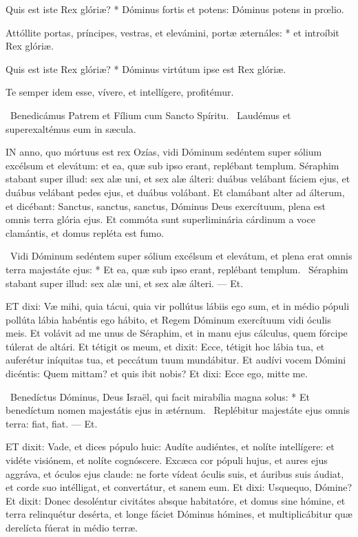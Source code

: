 Quis est iste Rex glóriæ? * Dóminus fortis et potens: Dóminus potens in prœlio.

Attóllite portas, príncipes, vestras, et elevámini, portæ æternáles: * et introíbit Rex glóriæ.

Quis est iste Rex glóriæ? * Dóminus virtútum ipse est Rex glóriæ.

 Te semper idem esse, vívere, et intellígere, profitémur.

\V\ Benedicámus Patrem et Fílium cum Sancto Spíritu. \R\ Laudémus et superexaltémus eum in sæcula.



\lettrine[lines=2]{I}{N} anno, quo mórtuus est rex Ozías, vidi Dóminum sedéntem super sólium excélsum et elevátum: et ea, quæ sub ipso erant, replébant templum. Séraphim stabant super illud: sex alæ uni, et sex alæ álteri: duábus velábant fáciem ejus, et duábus velábant pedes ejus, et duábus volábant. Et clamábant alter ad álterum, et dicébant: Sanctus, sanctus, sanctus, Dóminus Deus exercítuum, plena est omnis terra glória ejus. Et commóta sunt superliminária cárdinum a voce clamántis, et domus repléta est fumo.

\R\ Vidi Dóminum sedéntem super sólium excélsum et elevátum, et plena erat omnis terra majestáte ejus: * Et ea, quæ sub ipso erant, replébant templum. \V\ Séraphim stabant super illud: sex alæ uni, et sex alæ álteri. --- Et.


\lettrine[lines=2]{E}{T} dixi: Væ mihi, quia tácui, quia vir pollútus lábiis ego sum, et in médio pópuli pollúta lábia habéntis ego hábito, et Regem Dóminum exercítuum vidi óculis meis. Et volávit ad me unus de Séraphim, et in manu ejus cálculus, quem fórcipe túlerat de altári. Et tétigit os meum, et dixit: Ecce, tétigit hoc lábia tua, et auferétur iníquitas tua, et peccátum tuum mundábitur. Et audívi vocem Dómini dicéntis: Quem mittam? et quis ibit nobis? Et dixi: Ecce ego, mitte me.

\R\ Benedíctus Dóminus, Deus Israël, qui facit mirabília magna solus: * Et benedíctum nomen majestátis ejus in ætérnum. \V\ Replébitur majestáte ejus omnis terra: fiat, fiat. --- Et.


\lettrine[lines=2]{E}{T} dixit: Vade, et dices pópulo huic: Audíte audiéntes, et nolíte intellígere: et vidéte visiónem, et nolíte cognóscere. Excæca cor pópuli hujus, et aures ejus aggráva, et óculos ejus claude: ne forte vídeat óculis suis, et áuribus suis áudiat, et corde suo intélligat, et convertátur, et sanem eum. Et dixi: Usquequo, Dómine? Et dixit: Donec desoléntur civitátes absque habitatóre, et domus sine hómine, et terra relinquétur desérta, et longe fáciet Dóminus hómines, et multiplicábitur quæ derelícta fúerat in médio terræ.

